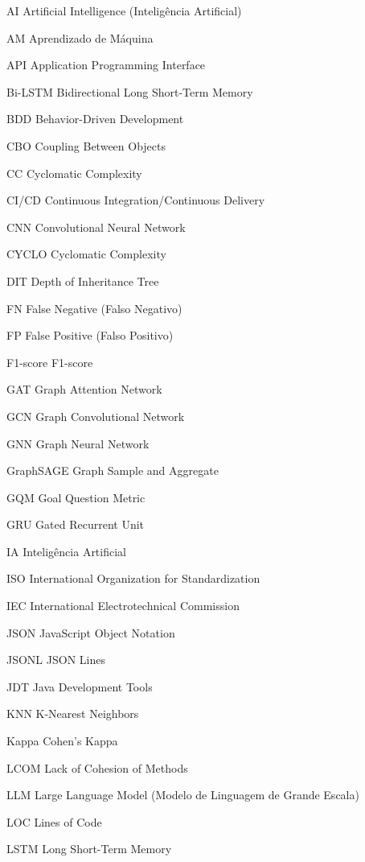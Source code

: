 \begin{siglas}
  \item[AI] Artificial Intelligence (Inteligência Artificial)
  \item[AM] Aprendizado de Máquina
  \item[API] Application Programming Interface
  \item[Bi-LSTM] Bidirectional Long Short-Term Memory
  \item[BDD] Behavior-Driven Development
  \item[CBO] Coupling Between Objects
  \item[CC] Cyclomatic Complexity
  \item[CI/CD] Continuous Integration/Continuous Delivery
  \item[CNN] Convolutional Neural Network
  \item[CYCLO] Cyclomatic Complexity
  \item[DIT] Depth of Inheritance Tree
  \item[FN] False Negative (Falso Negativo)
  \item[FP] False Positive (Falso Positivo)
  \item[F1-score] F1-score
  \item[GAT] Graph Attention Network
  \item[GCN] Graph Convolutional Network
  \item[GNN] Graph Neural Network
  \item[GraphSAGE] Graph Sample and Aggregate
  \item[GQM] Goal Question Metric
  \item[GRU] Gated Recurrent Unit
  \item[IA] Inteligência Artificial
  \item[ISO] International Organization for Standardization
  \item[IEC] International Electrotechnical Commission
  \item[JSON] JavaScript Object Notation
  \item[JSONL] JSON Lines
  \item[JDT] Java Development Tools
  \item[KNN] K-Nearest Neighbors
  \item[Kappa] Cohen's Kappa
  \item[LCOM] Lack of Cohesion of Methods
  \item[LLM] Large Language Model (Modelo de Linguagem de Grande Escala)
  \item[LOC] Lines of Code
  \item[LSTM] Long Short-Term Memory

\end{siglas}
